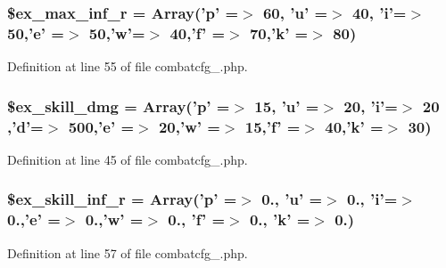 \hypertarget{combatcfg__1_8php_a5d883df69e92e48c5216428a88964239}{
\subsubsection[{\$ex\+\_\+max\+\_\+inf\+\_\+r}]{\setlength{\rightskip}{0pt plus 5cm}\$ex\+\_\+max\+\_\+inf\+\_\+r = Array('p' =$>$ 60, 'u' =$>$ 40, 'i'=$>$ 50,'e' =$>$ 50,'w'=$>$ 40,'f' =$>$ 70,'k' =$>$ 80)}}\label{combatcfg__1_8php_a5d883df69e92e48c5216428a88964239}


Definition at line 55 of file combatcfg\+\_.\+php.

\hypertarget{combatcfg__1_8php_afe8309dffd15839d5eef23c95b70c72a}{
\subsubsection[{\$ex\+\_\+skill\+\_\+dmg}]{\setlength{\rightskip}{0pt plus 5cm}\$ex\+\_\+skill\+\_\+dmg = Array('p' =$>$ 15, 'u' =$>$ 20, 'i'=$>$ 20 ,'d'=$>$ 500,'e' =$>$ 20,'w' =$>$ 15,'f' =$>$ 40,'k' =$>$ 30)}}\label{combatcfg__1_8php_afe8309dffd15839d5eef23c95b70c72a}


Definition at line 45 of file combatcfg\+\_.\+php.

\hypertarget{combatcfg__1_8php_a42c06eefc7604593c5655352e79c89c4}{
\subsubsection[{\$ex\+\_\+skill\+\_\+inf\+\_\+r}]{\setlength{\rightskip}{0pt plus 5cm}\$ex\+\_\+skill\+\_\+inf\+\_\+r = Array('p' =$>$ 0., 'u' =$>$ 0., 'i'=$>$ 0.,'e' =$>$ 0.,'w' =$>$ 0., 'f' =$>$ 0., 'k' =$>$ 0.)}}\label{combatcfg__1_8php_a42c06eefc7604593c5655352e79c89c4}


Definition at line 57 of file combatcfg\+\_.\+php.


